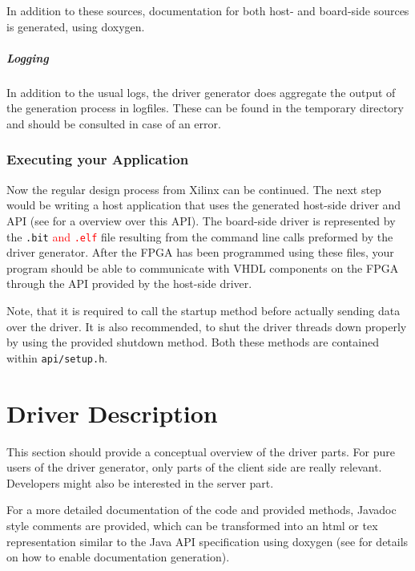 \documentclass{report}
\begin{document}
In addition to these sources, documentation for both host- and board-side sources is generated, using doxygen.

\paragraph{Logging}
In addition to the usual logs, the driver generator does aggregate the output of the generation process in logfiles. These can be found in the temporary directory and should be consulted in case of an error.

\subsection{Executing your Application}
Now the regular design process from Xilinx can be continued. The next step would be writing a host application that uses the generated host-side driver and API (see  for a overview over this API). The board-side driver is represented by the \texttt{.bit} \textcolor{red}{and \texttt{.elf}} file resulting from the command line calls preformed by the driver generator. After the FPGA has been programmed using these files, your program should be able to communicate with VHDL components on the FPGA through the API provided by the host-side driver.

Note, that it is required to call the startup method before actually sending data over the driver. It is also recommended, to shut the driver threads down properly by using the provided shutdown method. Both these methods are contained within \texttt{api/setup.h}.

\chapter{Driver Description}
This section should provide a conceptual overview of the driver parts. For pure users of the driver generator, only parts of the client side are really relevant. Developers might also be interested in the server part.

For a more detailed documentation of the code and provided methods, Javadoc style comments are provided, which can be transformed into an html or tex representation similar to the Java API specification using doxygen (see  for details on how to enable documentation generation).
\end{document}

